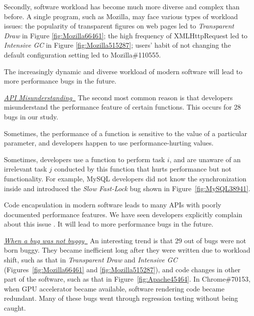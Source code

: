 Secondly, software workload has become much more diverse and complex than 
before.
A single program, such as Mozilla, may face various types of workload issues:
the popularity of transparent figures on web pages led
to {\it Transparent Draw} 
in Figure \ref{fig:Mozilla66461}; the high frequency of XMLHttpRequest led to
{\it Intensive GC}
in Figure \ref{fig:Mozilla515287}; users' habit of not changing the default
configuration setting led to Mozilla\#110555. 

The increasingly dynamic and diverse workload of modern software will lead
to more performance bugs in the future.

\underline{\it API Misunderstanding\ }
The second most common reason is that
developers misunderstand the performance feature of certain
functions. This occurs for 28 bugs in our study.

Sometimes, the performance of a function is sensitive to the value of a
particular parameter, and developers happen to use performance-hurting values. 

Sometimes, developers use a function to perform task $i$, and are unaware of
an irrelevant task $j$ 
conducted by this function that hurts performance but not functionality. 
For example, MySQL developers did not know the synchronization inside
 and introduced the {\it Slow Fast-Lock} bug shown in 
Figure~\ref{fig:MySQL38941}. 

Code encapsulation in modern software leads to many APIs with poorly 
documented performance features. 
We have seen developers explicitly complain about this issue 
\citep{apache45396}. It will lead to more performance bugs in the future.

\underline{\it When a bug was not buggy\ }
An interesting trend is that 29 out of \allbugs bugs were not born buggy.
They became inefficient long after they were written due to workload shift,
such as that in {\it Transparent Draw} and {\it Intensive GC}
(Figures~\ref{fig:Mozilla66461} and \ref{fig:Mozilla515287}), 
and code changes in other part of the software, such as
that in Figure~\ref{fig:Apache45464}.
In Chrome\#70153, when GPU accelerator became available, software
rendering code became redundant.
Many of these bugs went through regression testing without being caught.
